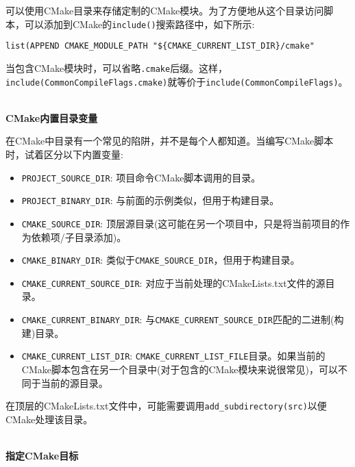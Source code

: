 可以使用CMake目录来存储定制的CMake模块。为了方便地从这个目录访问脚本，可以添加到CMake的\texttt{include()}搜索路径中，如下所示:

\begin{lstlisting}[style=styleCMake]
list(APPEND CMAKE_MODULE_PATH "${CMAKE_CURRENT_LIST_DIR}/cmake"
\end{lstlisting}

当包含CMake模块时，可以省略\texttt{.cmake}后缀。这样，\texttt{include(CommonCompileFlags.cmake)}就等价于\texttt{include(CommonCompileFlags)}。

\hspace*{\fill} \\ %
\noindent
\textbf{CMake内置目录变量}

在CMake中目录有一个常见的陷阱，并不是每个人都知道。当编写CMake脚本时，试着区分以下内置变量:

\begin{itemize}
\item 
\texttt{PROJECT\_SOURCE\_DIR}: 项目命令CMake脚本调用的目录。

\item 
\texttt{PROJECT\_BINARY\_DIR}: 与前面的示例类似，但用于构建目录。

\item 
\texttt{CMAKE\_SOURCE\_DIR}: 顶层源目录(这可能在另一个项目中，只是将当前项目的作为依赖项/子目录添加)。

\item 
\texttt{CMAKE\_BINARY\_DIR}: 类似于\texttt{CMAKE\_SOURCE\_DIR}，但用于构建目录。

\item 
\texttt{CMAKE\_CURRENT\_SOURCE\_DIR}: 对应于当前处理的CMakeLists.txt文件的源目录。

\item 
\texttt{CMAKE\_CURRENT\_BINARY\_DIR}: 与\texttt{CMAKE\_CURRENT\_SOURCE\_DIR}匹配的二进制(构建)目录。

\item 
\texttt{CMAKE\_CURRENT\_LIST\_DIR}: \texttt{CMAKE\_CURRENT\_LIST\_FILE}目录。如果当前的CMake脚本包含在另一个目录中(对于包含的CMake模块来说很常见)，可以不同于当前的源目录。
\end{itemize}

在顶层的CMakeLists.txt文件中，可能需要调用\texttt{add\_subdirectory(src)}以便CMake处理该目录。

\hspace*{\fill} \\ %
\noindent
\textbf{指定CMake目标}

